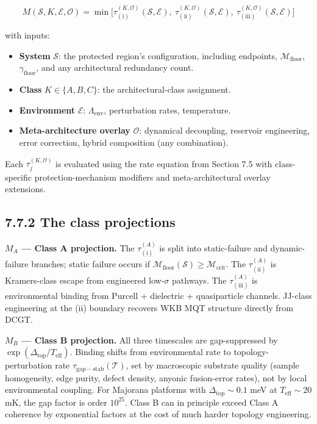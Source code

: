 \documentclass[11pt]{book}
\begin{document}
\[
M(\mathcal{S}, K, \mathcal{E}, \mathcal{O}) = \min\bigl[\tau_{(\mathrm{i})}^{(K, \mathcal{O})}(\mathcal{S}, \mathcal{E}),\ \tau_{(\mathrm{ii})}^{(K, \mathcal{O})}(\mathcal{S}, \mathcal{E}),\ \tau_{(\mathrm{iii})}^{(K, \mathcal{O})}(\mathcal{S}, \mathcal{E})\bigr]
\]

with inputs:

\begin{itemize}
\item \textbf{System} $\mathcal{S}$: the protected region's configuration, including endpoints, $\mathcal{M}_\mathrm{floor}$, $\gamma_\mathrm{floor}$, and any architectural redundancy count.
\item \textbf{Class} $K \in \{A, B, C\}$: the architectural-class assignment.
\item \textbf{Environment} $\mathcal{E}$: $\Lambda_\mathrm{env}$, perturbation rates, temperature.
\item \textbf{Meta-architecture overlay} $\mathcal{O}$: dynamical decoupling, reservoir engineering, error correction, hybrid composition (any combination).
\end{itemize}

Each $\tau_j^{(K,\mathcal{O})}$ is evaluated using the rate equation from Section 7.5 with class-specific protection-mechanism modifiers and meta-architectural overlay extensions.

\subsection{7.7.2 The class projections}

\textbf{$M_A$ — Class A projection.} The $\tau_{(\mathrm{i})}^{(A)}$ is split into static-failure and dynamic-failure branches; static failure occurs if $\mathcal{M}_\mathrm{floor}(\mathcal{S}) \geq \mathcal{M}_\mathrm{crit}$. The $\tau_{(\mathrm{ii})}^{(A)}$ is Kramers-class escape from engineered low-$\sigma$ pathways. The $\tau_{(\mathrm{iii})}^{(A)}$ is environmental binding from Purcell + dielectric + quasiparticle channels. JJ-class engineering at the (ii) boundary recovers WKB MQT structure directly from DCGT.

\textbf{$M_B$ — Class B projection.} All three timescales are gap-suppressed by $\exp(\Delta_\mathrm{top}/T_\mathrm{eff})$. Binding shifts from environmental rate to topology-perturbation rate $\tau_\mathrm{gap-stab}(\mathcal{T})$, set by macroscopic substrate quality (sample homogeneity, edge purity, defect density, anyonic fusion-error rates), not by local environmental coupling. For Majorana platforms with $\Delta_\mathrm{top} \sim 0.1$ meV at $T_\mathrm{eff} \sim 20$ mK, the gap factor is order $10^{25}$. Class B can in principle exceed Class A coherence by exponential factors at the cost of much harder topology engineering.
\end{document}
